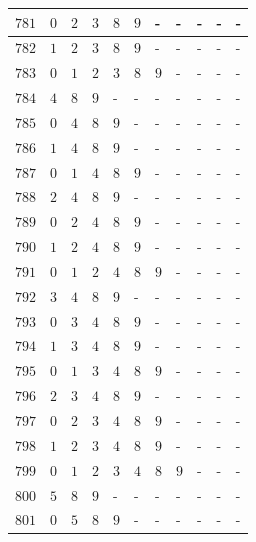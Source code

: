 \begin{appendices}
\begin{table}[H]
\begin{tabular} {|l|l|l|l|l|l|l|l|l|l|l|}
  		$ 781 $ & $ 0 $ &$ 2 $ &$ 3 $ &$ 8 $ &$ 9 $ & - &  - &  - &  - &  -   \\ \hline
  		$ 782 $ & $ 1 $ &$ 2 $ &$ 3 $ &$ 8 $ &$ 9 $ & - &  - &  - &  - &  -   \\ \hline
  		$ 783 $ & $ 0 $ &$ 1 $ &$ 2 $ &$ 3 $ &$ 8 $ &$ 9 $ & - &  - &  - &  -   \\ \hline
  		$ 784 $ & $ 4 $ &$ 8 $ &$ 9 $ & - &  - &  - &  - &  - &  - &  -   \\ \hline
  		$ 785 $ & $ 0 $ &$ 4 $ &$ 8 $ &$ 9 $ & - &  - &  - &  - &  - &  -   \\ \hline
  		$ 786 $ & $ 1 $ &$ 4 $ &$ 8 $ &$ 9 $ & - &  - &  - &  - &  - &  -   \\ \hline
  		$ 787 $ & $ 0 $ &$ 1 $ &$ 4 $ &$ 8 $ &$ 9 $ & - &  - &  - &  - &  -   \\ \hline
  		$ 788 $ & $ 2 $ &$ 4 $ &$ 8 $ &$ 9 $ & - &  - &  - &  - &  - &  -   \\ \hline
  		$ 789 $ & $ 0 $ &$ 2 $ &$ 4 $ &$ 8 $ &$ 9 $ & - &  - &  - &  - &  -   \\ \hline
  		$ 790 $ & $ 1 $ &$ 2 $ &$ 4 $ &$ 8 $ &$ 9 $ & - &  - &  - &  - &  -   \\ \hline
  		$ 791 $ & $ 0 $ &$ 1 $ &$ 2 $ &$ 4 $ &$ 8 $ &$ 9 $ & - &  - &  - &  -   \\ \hline
  		$ 792 $ & $ 3 $ &$ 4 $ &$ 8 $ &$ 9 $ & - &  - &  - &  - &  - &  -   \\ \hline
  		$ 793 $ & $ 0 $ &$ 3 $ &$ 4 $ &$ 8 $ &$ 9 $ & - &  - &  - &  - &  -   \\ \hline
  		$ 794 $ & $ 1 $ &$ 3 $ &$ 4 $ &$ 8 $ &$ 9 $ & - &  - &  - &  - &  -   \\ \hline
  		$ 795 $ & $ 0 $ &$ 1 $ &$ 3 $ &$ 4 $ &$ 8 $ &$ 9 $ & - &  - &  - &  -   \\ \hline
  		$ 796 $ & $ 2 $ &$ 3 $ &$ 4 $ &$ 8 $ &$ 9 $ & - &  - &  - &  - &  -   \\ \hline
  		$ 797 $ & $ 0 $ &$ 2 $ &$ 3 $ &$ 4 $ &$ 8 $ &$ 9 $ & - &  - &  - &  -   \\ \hline
  		$ 798 $ & $ 1 $ &$ 2 $ &$ 3 $ &$ 4 $ &$ 8 $ &$ 9 $ & - &  - &  - &  -   \\ \hline
  		$ 799 $ & $ 0 $ &$ 1 $ &$ 2 $ &$ 3 $ &$ 4 $ &$ 8 $ &$ 9 $ & - &  - &  -   \\ \hline
  		$ 800 $ & $ 5 $ &$ 8 $ &$ 9 $ & - &  - &  - &  - &  - &  - &  -   \\ \hline
  		$ 801 $ & $ 0 $ &$ 5 $ &$ 8 $ &$ 9 $ & - &  - &  - &  - &  - &  -   \\ \hline

\end{tabular}
\end{table}
\end{appendices}
